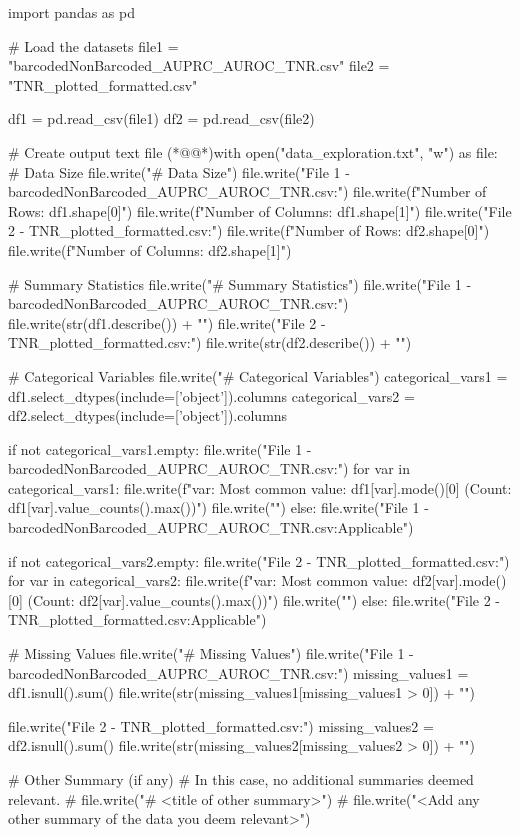\documentclass[11pt]{article}
\begin{document}
\begin{python}

import pandas as pd

# Load the datasets
file1 = "barcodedNonBarcoded_AUPRC_AUROC_TNR.csv"
file2 = "TNR_plotted_formatted.csv"

df1 = pd.read_csv(file1)
df2 = pd.read_csv(file2)

# Create output text file
(*@@*)with open("data_exploration.txt", "w") as file:
    # Data Size
    file.write("# Data Size\n")
    file.write("File 1 - barcodedNonBarcoded_AUPRC_AUROC_TNR.csv:\n")
    file.write(f"Number of Rows: {df1.shape[0]}\n")
    file.write(f"Number of Columns: {df1.shape[1]}\n\n")
    file.write("File 2 - TNR_plotted_formatted.csv:\n")
    file.write(f"Number of Rows: {df2.shape[0]}\n")
    file.write(f"Number of Columns: {df2.shape[1]}\n\n")
    
    # Summary Statistics
    file.write("# Summary Statistics\n")
    file.write("File 1 - barcodedNonBarcoded_AUPRC_AUROC_TNR.csv:\n")
    file.write(str(df1.describe()) + "\n\n")
    file.write("File 2 - TNR_plotted_formatted.csv:\n")
    file.write(str(df2.describe()) + "\n\n")
    
    # Categorical Variables
    file.write("# Categorical Variables\n")
    categorical_vars1 = df1.select_dtypes(include=['object']).columns
    categorical_vars2 = df2.select_dtypes(include=['object']).columns
    
    if not categorical_vars1.empty:
        file.write("File 1 - barcodedNonBarcoded_AUPRC_AUROC_TNR.csv:\n")
        for var in categorical_vars1:
            file.write(f"{var}: Most common value: {df1[var].mode()[0]} (Count: {df1[var].value_counts().max()})\n")
        file.write("\n")
    else:
        file.write("File 1 - barcodedNonBarcoded_AUPRC_AUROC_TNR.csv:\nNot Applicable\n\n")
    
    if not categorical_vars2.empty:
        file.write("File 2 - TNR_plotted_formatted.csv:\n")
        for var in categorical_vars2:
            file.write(f"{var}: Most common value: {df2[var].mode()[0]} (Count: {df2[var].value_counts().max()})\n")
        file.write("\n")
    else:
        file.write("File 2 - TNR_plotted_formatted.csv:\nNot Applicable\n\n")
    
    # Missing Values
    file.write("# Missing Values\n")
    file.write("File 1 - barcodedNonBarcoded_AUPRC_AUROC_TNR.csv:\n")
    missing_values1 = df1.isnull().sum()
    file.write(str(missing_values1[missing_values1 > 0]) + "\n\n")
    
    file.write("File 2 - TNR_plotted_formatted.csv:\n")
    missing_values2 = df2.isnull().sum()
    file.write(str(missing_values2[missing_values2 > 0]) + "\n\n")
    
    # Other Summary (if any)
    # In this case, no additional summaries deemed relevant.
    # file.write("# <title of other summary>\n")
    # file.write("<Add any other summary of the data you deem relevant>\n\n")

\end{python}
\end{document}
